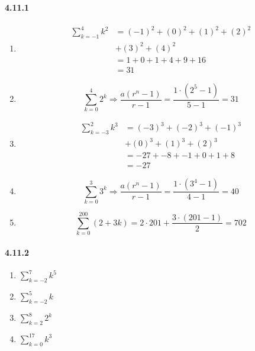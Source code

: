 \documentclass[11pt, letterpaper, twocolumn, fleqn]{article}
\begin{document}
    \paragraph{4.11.1}
        \begin{enumerate}
            \item 
                \begin{align*}
                 \sum_{k=-1}^{4}k^2 &= (-1)^2 + (0)^2 + (1)^2 + (2)^2 \\
                                    &+ (3)^2 + (4)^2 \\
                                    &= 1 + 0 + 1 + 4 + 9 + 16 \\
                                    &= 31
                \end{align*}
            \item $$\sum_{k=0}^4 2^k \Rightarrow \frac{a(r^n-1)}{r-1} = \frac{1\cdot(2^5-1)}{5-1} = 31$$
            \item 
                \begin{align*}
                 \sum_{k=-3}^{2}k^3 &= (-3)^3 + (-2)^3 + (-1)^3 \\
                                    &+ (0)^3 + (1)^3 + (2)^3 \\
                                    &= -27 + -8 + -1 + 0 + 1 + 8 \\
                                    &= -27
                \end{align*}
            \item $$\sum_{k=0}^3 3^k \Rightarrow \frac{a(r^n-1)}{r-1} = \frac{1\cdot(3^4-1)}{4-1} = 40$$
            \item $$\sum_{k=0}^{200} (2+3k) = 2 \cdot 201 + \frac{3 \cdot (201-1)}{2} = 702$$
        \end{enumerate}
    
    \paragraph{4.11.2}
        \begin{enumerate}
            \item $\sum_{k=-2}^{7} k^5$
            \item $\sum_{k=-2}^{5} k $
            \item $\sum_{k=2}^{8} 2^k$
            \item $\sum_{k=0}^{17} k^3$
        \end{enumerate}
    
\end{document}
